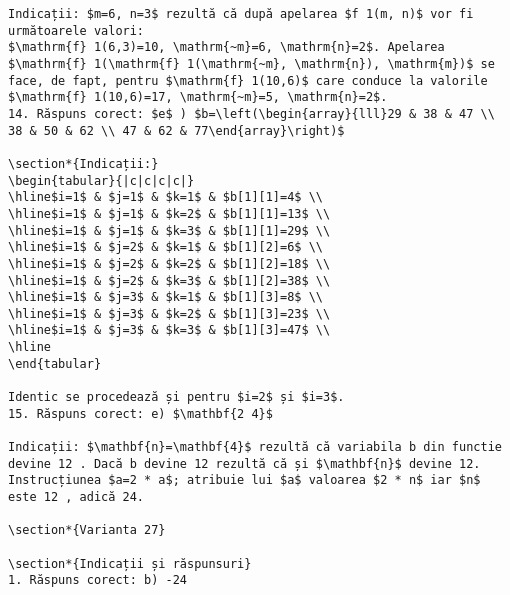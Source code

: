 \begin{verbatim}
Indicații: $m=6, n=3$ rezultă că după apelarea $f 1(m, n)$ vor fi următoarele valori:
$\mathrm{f} 1(6,3)=10, \mathrm{~m}=6, \mathrm{n}=2$. Apelarea $\mathrm{f} 1(\mathrm{f} 1(\mathrm{~m}, \mathrm{n}), \mathrm{m})$ se face, de fapt, pentru $\mathrm{f} 1(10,6)$ care conduce la valorile $\mathrm{f} 1(10,6)=17, \mathrm{~m}=5, \mathrm{n}=2$.
14. Răspuns corect: $e$ ) $b=\left(\begin{array}{lll}29 & 38 & 47 \\ 38 & 50 & 62 \\ 47 & 62 & 77\end{array}\right)$

\section*{Indicații:}
\begin{tabular}{|c|c|c|c|}
\hline$i=1$ & $j=1$ & $k=1$ & $b[1][1]=4$ \\
\hline$i=1$ & $j=1$ & $k=2$ & $b[1][1]=13$ \\
\hline$i=1$ & $j=1$ & $k=3$ & $b[1][1]=29$ \\
\hline$i=1$ & $j=2$ & $k=1$ & $b[1][2]=6$ \\
\hline$i=1$ & $j=2$ & $k=2$ & $b[1][2]=18$ \\
\hline$i=1$ & $j=2$ & $k=3$ & $b[1][2]=38$ \\
\hline$i=1$ & $j=3$ & $k=1$ & $b[1][3]=8$ \\
\hline$i=1$ & $j=3$ & $k=2$ & $b[1][3]=23$ \\
\hline$i=1$ & $j=3$ & $k=3$ & $b[1][3]=47$ \\
\hline
\end{tabular}

Identic se procedează și pentru $i=2$ și $i=3$.
15. Răspuns corect: e) $\mathbf{2 4}$

Indicații: $\mathbf{n}=\mathbf{4}$ rezultă că variabila b din functie devine 12 . Dacă b devine 12 rezultă că și $\mathbf{n}$ devine 12. Instrucțiunea $a=2 * a$; atribuie lui $a$ valoarea $2 * n$ iar $n$ este 12 , adică 24.

\section*{Varianta 27}

\section*{Indicații și răspunsuri}
1. Răspuns corect: b) -24


\end{verbatim}
